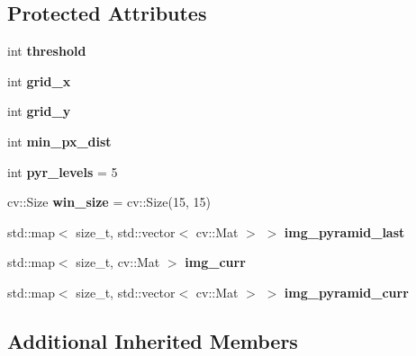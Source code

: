 \subsection*{Protected Attributes}
\begin{DoxyCompactItemize}
\item 
\mbox{\label{classov__core_1_1TrackKLT_ab66cf20d8dbd8140c5dddc3d584456d5}} 
int {\bfseries threshold}
\item 
\mbox{\label{classov__core_1_1TrackKLT_afecb0e0e193ad6700b1d03dbdaaf2ec8}} 
int {\bfseries grid\+\_\+x}
\item 
\mbox{\label{classov__core_1_1TrackKLT_ad41e009a38f832b55b833ad17e094b20}} 
int {\bfseries grid\+\_\+y}
\item 
\mbox{\label{classov__core_1_1TrackKLT_afcbe4f18535bc61a978eda8c9e55a724}} 
int {\bfseries min\+\_\+px\+\_\+dist}
\item 
\mbox{\label{classov__core_1_1TrackKLT_a66578875c6e0313f25e53c1de196e9cc}} 
int {\bfseries pyr\+\_\+levels} = 5
\item 
\mbox{\label{classov__core_1_1TrackKLT_ab345d0732346d1f2af5c4a90cd6d24db}} 
cv\+::\+Size {\bfseries win\+\_\+size} = cv\+::\+Size(15, 15)
\item 
\mbox{\label{classov__core_1_1TrackKLT_a0ab430fba27de7331ea06b153db82826}} 
std\+::map$<$ size\+\_\+t, std\+::vector$<$ cv\+::\+Mat $>$ $>$ {\bfseries img\+\_\+pyramid\+\_\+last}
\item 
\mbox{\label{classov__core_1_1TrackKLT_a5240e79f3bd76eae568a5115b9c5e94f}} 
std\+::map$<$ size\+\_\+t, cv\+::\+Mat $>$ {\bfseries img\+\_\+curr}
\item 
\mbox{\label{classov__core_1_1TrackKLT_a0b7ce6ff25bfb1e09652e236cccc89c7}} 
std\+::map$<$ size\+\_\+t, std\+::vector$<$ cv\+::\+Mat $>$ $>$ {\bfseries img\+\_\+pyramid\+\_\+curr}
\end{DoxyCompactItemize}
\subsection*{Additional Inherited Members}


